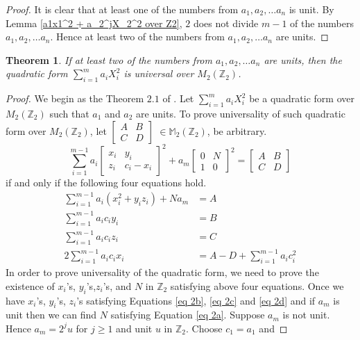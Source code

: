 \documentclass[12pt,a4paper]{article}
\newtheorem{thm}{Theorem}[section]
\begin{document}
	\begin{proof}
		It is clear that at least one of the numbers from $a_1,a_2, \ldots a_n$ is unit. By Lemma \ref{a1x1^2 + a_2^jX_2^2 over Z2}, $2$ does not divide $m-1$ of the numbers $a_1,a_2, \ldots a_n$. Hence at least two of the numbers from $a_1,a_2, \ldots a_n$ are units.
	\end{proof}
	\begin{thm} \label{suff condition main thm p=2}
		If at least two of the numbers from $a_1,a_2, \ldots a_n$ are units, then the quadratic form $\sum_{i=1}^{m} a_iX_i^2$ is universal over $M_2(\mathbb{Z}_2)$.
	\end{thm}
	\begin{proof}
		We begin as the Theorem $2.1$ of \cite{JunginLee}.  Let $\sum_{i=1}^{m} a_iX_i^2$ be a quadratic form over $M_2(\mathbb{Z}_2)$ such that $a_1$ and $a_2$ are units. To prove universality of such quadratic form over $M_2(\mathbb{Z}_2)$, let $ \begin{bmatrix}
			A & B  \\
			C & D  
		\end{bmatrix} $ $\in \mathbb{M}_2(\mathbb{Z}_2)$, be arbitrary. 
		\begin{equation} 
			\sum_{i=1}^{m-1} a_i \begin{bmatrix}
				x_i & y_i  \\
				z_i & c_i-x_i  
			\end{bmatrix}^2 +a_m \begin{bmatrix}
				0 & N\\
				1 & 0
			\end{bmatrix}^2 = \begin{bmatrix}
				A & B \\
				C & D
			\end{bmatrix} \label{eq 1}
		\end{equation}
		if and only if the following four equations hold.
		\begin{subequations}
			\begin{align}
				\sum_{i=1}^{m-1} a_i (x_i^2 + y_iz_i) + Na_m &= A  \label{eq 2a}\\
				\sum_{i=1}^{m-1}a_ic_iy_i &= B  \label{eq 2b}\\
				\sum_{i=1}^{m-1} a_ic_iz_i &= C \label{eq 2c} \\
				2 \sum_{i=1}^{m-1} a_ic_ix_i &= {A-D+ \sum_{i=1}^{m-1} a_ic_i^2} \label{eq 2d}
			\end{align}
		\end{subequations}
		In order to prove universality of the quadratic form, we need to prove the existence of $x_i$'s, $y_i$'s,$z_i$'s, and $N$ in $\mathbb{Z}_2$ satisfying above four equations. Once we have $x_i$'s, $y_i$'s, $z_i$'s satisfying Equations \eqref{eq 2b}, \eqref{eq 2c} and \eqref{eq 2d}   and if $a_m$ is unit then we can find $N$ satisfying Equation \eqref{eq 2a}. Suppose $a_m$ is not unit. Hence $a_m=2^j u$ for $j \geq 1$ and unit $u$ in $\mathbb{Z}_2$. Choose $c_1=a_1$ and 

\end{proof}
\end{document}
